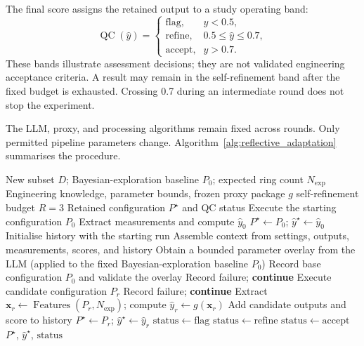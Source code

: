 \documentclass[a4paper,fleqn]{cas-dc}
\begin{document}
{The final score assigns the retained output to a study operating band:
\begin{equation}
\operatorname{QC}(\hat{y})=
\begin{cases}
\text{flag}, & \hat{y}<0.5,\\
\text{refine}, & 0.5\leq\hat{y}\leq0.7,\\
\text{accept}, & \hat{y}>0.7.
\end{cases}
\label{eq:qc-bands}
\end{equation}
These bands illustrate assessment decisions; they are not validated engineering acceptance criteria. A result may remain in the self-refinement band after the fixed budget is exhausted. Crossing 0.7 during an intermediate round does not stop the experiment.

The LLM, proxy, and processing algorithms remain fixed across rounds. Only permitted pipeline parameters change. Algorithm~\ref{alg:reflective_adaptation} summarises the procedure.

\begin{algorithm}[ht]
\caption{Proxy-guided parameter self-refinement}
\label{alg:reflective_adaptation}
\begin{algorithmic}[1]
\Require New subset $D$; Bayesian-exploration baseline $P_0$; expected ring count $N_{\mathrm{exp}}$
\Require Engineering knowledge, parameter bounds, frozen proxy package $g$
\Require self-refinement budget $R=3$
\Ensure Retained configuration $P^\star$ and QC status
\State Execute the starting configuration $P_0$
\State Extract measurements and compute $\hat{y}_0$
\State $P^\star\gets P_0$; $\hat{y}^\star\gets\hat{y}_0$
\State Initialise history with the starting run
    \State Assemble context from settings, outputs, measurements, scores, and history
    \State Obtain a bounded parameter overlay from the LLM (applied to the fixed Bayesian-exploration baseline $P_0$)
    \State Record base configuration $P_0$ and validate the overlay
        \State Record failure; \textbf{continue}
    \EndIf
    \State Execute candidate configuration $P_r$
        \State Record failure; \textbf{continue}
    \EndIf
    \State Extract $\mathbf{x}_r\gets\operatorname{Features}(P_r,N_{\mathrm{exp}})$; compute $\hat{y}_r\gets g(\mathbf{x}_r)$
    \State Add candidate outputs and score to history
        \State $P^\star\gets P_r$; $\hat{y}^\star\gets\hat{y}_r$
    \EndIf
\EndFor
{}
    \State $\mathrm{status}\gets\mathrm{flag}$
    \State $\mathrm{status}\gets\mathrm{refine}$
\Else
    \State $\mathrm{status}\gets\mathrm{accept}$
\EndIf
\State \Return $P^\star$, $\hat{y}^\star$, $\mathrm{status}$
\end{algorithmic}
\end{algorithm}


}
\end{document}
